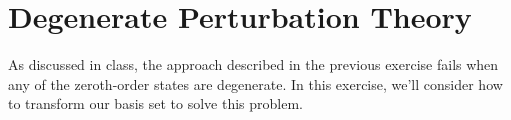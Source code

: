 %
%
%
%

\section*{Degenerate Perturbation Theory}

	As discussed in class, the approach described in the previous exercise fails when any of the zeroth-order states are degenerate. In this exercise, we'll consider how to transform our basis set to solve this problem.

